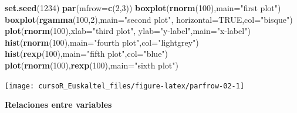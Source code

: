 \documentclass[]{book}
\newenvironment{Shaded}{\begin{snugshade}}{\end{snugshade}}
\newcommand{\KeywordTok}[1]{\textcolor[rgb]{0.13,0.29,0.53}{\textbf{#1}}}
\newcommand{\DataTypeTok}[1]{\textcolor[rgb]{0.13,0.29,0.53}{#1}}
\newcommand{\DecValTok}[1]{\textcolor[rgb]{0.00,0.00,0.81}{#1}}
\newcommand{\StringTok}[1]{\textcolor[rgb]{0.31,0.60,0.02}{#1}}
\newcommand{\OtherTok}[1]{\textcolor[rgb]{0.56,0.35,0.01}{#1}}
\newcommand{\NormalTok}[1]{#1}
\begin{document}
\begin{Shaded}
\begin{Highlighting}[]
\KeywordTok{set.seed}\NormalTok{(}\DecValTok{1234}\NormalTok{)}
 \KeywordTok{par}\NormalTok{(}\DataTypeTok{mfrow=}\KeywordTok{c}\NormalTok{(}\DecValTok{2}\NormalTok{,}\DecValTok{3}\NormalTok{))}
 \KeywordTok{boxplot}\NormalTok{(}\KeywordTok{rnorm}\NormalTok{(}\DecValTok{100}\NormalTok{),}\DataTypeTok{main=}\StringTok{"first plot"}\NormalTok{)}
 \KeywordTok{boxplot}\NormalTok{(}\KeywordTok{rgamma}\NormalTok{(}\DecValTok{100}\NormalTok{,}\DecValTok{2}\NormalTok{),}\DataTypeTok{main=}\StringTok{"second plot"}\NormalTok{, }\DataTypeTok{horizontal=}\OtherTok{TRUE}\NormalTok{,}\DataTypeTok{col=}\StringTok{"bisque"}\NormalTok{)}
 \KeywordTok{plot}\NormalTok{(}\KeywordTok{rnorm}\NormalTok{(}\DecValTok{100}\NormalTok{),}\DataTypeTok{xlab=}\StringTok{"third plot"}\NormalTok{,}
      \DataTypeTok{ylab=}\StringTok{"y-label"}\NormalTok{,}\DataTypeTok{main=}\StringTok{"x-label"}\NormalTok{)}
 \KeywordTok{hist}\NormalTok{(}\KeywordTok{rnorm}\NormalTok{(}\DecValTok{100}\NormalTok{),}\DataTypeTok{main=}\StringTok{"fourth plot"}\NormalTok{,}\DataTypeTok{col=}\StringTok{"lightgrey"}\NormalTok{)}
 \KeywordTok{hist}\NormalTok{(}\KeywordTok{rexp}\NormalTok{(}\DecValTok{100}\NormalTok{),}\DataTypeTok{main=}\StringTok{"fifth plot"}\NormalTok{,}\DataTypeTok{col=}\StringTok{"blue"}\NormalTok{)}
 \KeywordTok{plot}\NormalTok{(}\KeywordTok{rnorm}\NormalTok{(}\DecValTok{100}\NormalTok{),}\KeywordTok{rexp}\NormalTok{(}\DecValTok{100}\NormalTok{),}\DataTypeTok{main=}\StringTok{"sixth plot"}\NormalTok{)}
\end{Highlighting}
\end{Shaded}

\begin{center}\texttt{[image: cursoR\_Euskaltel\_files/figure-latex/parfrow-02-1]} \end{center}

\textbf{Relaciones entre variables}
\end{document}
